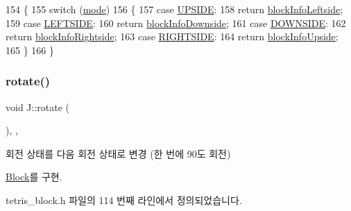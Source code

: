 \begin{DoxyCode}
154     \{
155         \textcolor{keywordflow}{switch} (\mbox{\hyperlink{class_j_a84f29c2144ce2c8ca0d369060589f0f4}{mode}})
156         \{
157         \textcolor{keywordflow}{case} \mbox{\hyperlink{class_block_a33a96023993478ad4b52426188454765a4529e89ca1c08cc5f81181e355719fad}{UPSIDE}}:
158             \textcolor{keywordflow}{return} \mbox{\hyperlink{class_j_a3772ed06ecd269c9bb646acb32ba1e57}{blockInfoLeftside}};
159         \textcolor{keywordflow}{case} \mbox{\hyperlink{class_block_a33a96023993478ad4b52426188454765a9c855bf91465e7da98901d7900740919}{LEFTSIDE}}:
160             \textcolor{keywordflow}{return} \mbox{\hyperlink{class_j_a8729720907e14a70874f8daa0b3f2971}{blockInfoDownside}};
161         \textcolor{keywordflow}{case} \mbox{\hyperlink{class_block_a33a96023993478ad4b52426188454765a73fd4ad0ff8642235ec8549f9290d13b}{DOWNSIDE}}:
162             \textcolor{keywordflow}{return} \mbox{\hyperlink{class_j_a412d1f5ebc3078b09d5568c16c741a25}{blockInfoRightside}};
163         \textcolor{keywordflow}{case} \mbox{\hyperlink{class_block_a33a96023993478ad4b52426188454765a005424e665ea0b83edfaf9ddb3ab85a1}{RIGHTSIDE}}:
164             \textcolor{keywordflow}{return} \mbox{\hyperlink{class_j_ab2d6ad0a92ed645027ee423bb4ff660b}{blockInfoUpside}};
165         \}
166     \}
\end{DoxyCode}
\mbox{\label{class_j_a79f9fdd2b9542a95d3d2f82381b1cb62}} 
\subsubsection{\texorpdfstring{rotate()}{rotate()}}
{\footnotesize\ttfamily void J\+::rotate (\begin{DoxyParamCaption}{ }\end{DoxyParamCaption})\hspace{0.3cm}{\ttfamily [inline]}, {\ttfamily [override]}, {\ttfamily [virtual]}}



회전 상태를 다음 회전 상태로 변경 (한 번에 90도 회전) 



\mbox{\hyperlink{class_block_af1499ad7e48fb750581b471d0d5bb0e0}{Block}}를 구현.



tetris\+\_\+block.\+h 파일의 114 번째 라인에서 정의되었습니다.


